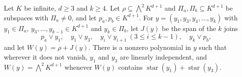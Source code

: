 \begin{lemma}
  \label{lem:pencil-d-stars-four}
  \leanok
  Let $K$ be infinite, $d \ge 3$ and $k \ge 4$. Let
  $\rho \subseteq \bigwedge^2 K^{d+1}$ and $\Pi_a, \Pi_b \subseteq K^{d+1}$
  be subspaces with $\Pi_a \neq 0$, and let $p_a, p_b \in K^{d+1}$. For
  $y = (y_1, y_3, y_4, \dots, y_k)$ with $y_1 \in \Pi_a$,
  $y_3, \dots, y_{k-1} \in K^{d+1}$ and $y_k \in \Pi_b$, let $J(y)$ be the
  span of the $k$ joins
  \[
    p_a \vee y_1,\quad y_1 \vee y_3,\quad y_i \vee y_{i+1}\
    (3 \le i \le k - 1),\quad y_k \vee p_b,
  \]
  and let $W(y) = \rho + J(y)$. There is a nonzero polynomial in $y$ such
  that wherever it does not vanish, $y_1$ and $y_3$ are linearly
  independent, and $W(y) = \bigwedge^2 K^{d+1}$ whenever $W(y)$ contains
  $\operatorname{star}(y_1) + \operatorname{star}(y_3)$.
\end{lemma}
